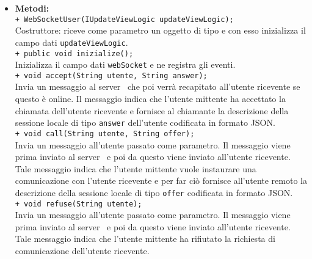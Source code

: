 {{\begin{sloppypar}
{{\begin{itemize}
{					\texttt{- ICommunicationLogic communicationLogic}: riferimento all'oggetto che gestisce la comunicazione.\\
					
					\texttt{- Vector<String> loginInput}: contiene i dati con i quali l'utente si è autenticato o ha tentato di farlo.\\
				}
			
				\item[] \textbf{Metodi:}{ \\
					\texttt{+ WebSocketUser(IUpdateViewLogic updateViewLogic);}\\
					Costruttore: riceve come parametro un oggetto di tipo  e con esso inizializza il campo dati \texttt{updateViewLogic}.\\

					\texttt{+ public void inizialize();}\\
					Inizializza il campo dati \texttt{webSocket} e ne registra gli eventi.\\

					\texttt{+ void accept(String utente, String answer);}\\
					Invia un messaggio al server\g~ che poi verrà recapitato all'utente ricevente se questo è online. Il messaggio indica che l'utente mittente ha accettato la chiamata dell'utente ricevente e fornisce al chiamante la descrizione della sessione locale di tipo \texttt{answer} dell'utente codificata in formato JSON\g.\\

					\texttt{+ void call(String utente, String offer);}\\
					Invia un messaggio all'utente passato come parametro. Il messaggio viene prima inviato al server\g~ e poi da questo viene inviato all'utente ricevente. Tale messaggio indica che l'utente mittente vuole instaurare una comunicazione con l'utente ricevente e per far ciò fornisce all'utente remoto la descrizione della sessione locale di tipo \texttt{offer} codificata in formato JSON.\\

					\texttt{+ void refuse(String utente);}\\
					Invia un messaggio all'utente passato come parametro. Il messaggio viene prima inviato al server\g~ e poi da questo viene inviato all'utente ricevente. Tale messaggio indica che l'utente mittente ha rifiutato la richiesta di comunicazione dell'utente ricevente.\\

}
\end{itemize}}}
\end{sloppypar}}}
